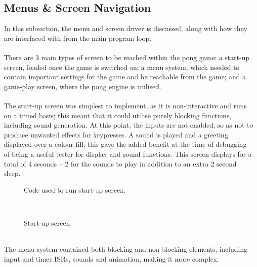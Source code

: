 \documentclass[a4paper,12pt]{article}
\begin{document}
\newpage
\subsection{Menus {\&} Screen Navigation}
\begin{flushleft}
In this subsection, the menu and screen driver is discussed, along with how they are interfaced with from the main program loop.
\\ \- \\
There are 3 main types of screen to be reached within the pong game: a start-up screen, loaded once the game is switched on; a menu system, which needed to contain important settings for the game and be reachable from the game; and a game-play screen, where the pong engine is utilised.
\\ \- \\  
The start-up screen was simplest to implement, as it is non-interactive and runs on a timed basis; this meant that it could utilise purely blocking functions, including sound generation. At this point, the inputs are not enabled, so as not to produce unwanted effects for keypresses. A sound is played and a greeting displayed over a colour fill; this gave the added benefit at the time of debugging of being a useful tester for display and sound functions. This screen displays for a total of 4 seconds – 2 for the sounds to play in addition to an extra 2 second sleep.
\begin{figure}[H]
  \centering
  
    \caption{Code used to run start-up screen.}
\end{figure}
\- \\
\begin{figure}[H]
  \centering
  \caption{Start-up screen}
\end{figure}
\- \\
The menu system contained both blocking and non-blocking elements, including input and timer ISRs, sounds and animation, making it more complex. 


\end{flushleft}
\end{document}
